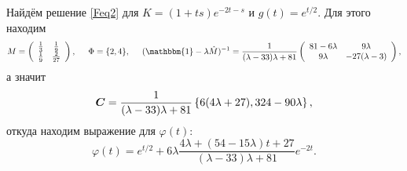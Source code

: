 Найдём решение \eqref{Feq2} для $K = (1 + ts)e^{-2t -s}$ и $g(t) = e^{t/2}$. 
Для этого находим
\begin{equation*}
	M = \left(
\begin{array}{cc}
 \frac{1}{3} & \frac{1}{9} \\
 \frac{1}{9} & \frac{2}{27} \\
\end{array}
\right),
\hspace{5 mm} 
\Phi = \{2,4\},
\hspace{5 mm} 
(\mathbbm{1} - \lambda \hat{M})^{-1} = \frac{1}{(\lambda -33) \lambda +81}\left(
\begin{array}{cc}
81-6 \lambda  & 9 \lambda  \\
 9 \lambda  & -27 (\lambda -3) \\
\end{array}
\right),
\end{equation*}
а значит
\begin{equation*}
	\mbox{\boldmath $C$} = \frac{1}{(\lambda -33) \lambda +81}\left\{6 (4 \lambda +27),324-90 \lambda \right\},
\end{equation*}
откуда находим выражение для $\varphi(t)$:
\begin{equation*}
	\varphi(t) = e^{t/2} + 6 \lambda  \frac{4 \lambda +(54-15 \lambda ) t+27}{(\lambda -33) \lambda +81} e^{-2 t}.
\end{equation*}





